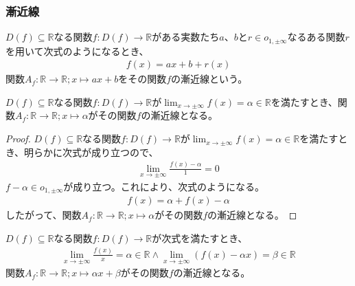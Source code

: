 \documentclass[dvipdfmx]{jsarticle}
\begin{document}
\subsubsection{漸近線}%
\begin{dfn}
$D(f) \subseteq \mathbb{R}$なる関数$f:D(f) \rightarrow \mathbb{R}$がある実数たち$a、bとr \in o_{1, \pm \infty}$なるある関数$r$を用いて次式のようになるとき、
\begin{align*}
f(x) = ax + b + r(x)
\end{align*}
関数$A_{f}:\mathbb{R} \rightarrow \mathbb{R};x \mapsto ax + b$をその関数$f$の漸近線という。
\end{dfn}
\begin{thm}\label{4.2.4.8}
$D(f) \subseteq \mathbb{R}$なる関数$f:D(f) \rightarrow \mathbb{R}$が$\lim_{x \rightarrow \pm \infty}{f(x)} = \alpha \in \mathbb{R}$を満たすとき、関数$A_{f}:\mathbb{R} \rightarrow \mathbb{R};x \mapsto \alpha$がその関数$f$の漸近線となる。
\end{thm}
\begin{proof}
$D(f) \subseteq \mathbb{R}$なる関数$f:D(f) \rightarrow \mathbb{R}$が$\lim_{x \rightarrow \pm \infty}{f(x)} = \alpha \in \mathbb{R}$を満たすとき、明らかに次式が成り立つので、
\begin{align*}
\lim_{x \rightarrow \pm \infty}\frac{f(x) - \alpha}{1} = 0
\end{align*}
$f - \alpha \in o_{1, \pm \infty}$が成り立つ。これにより、次式のようになる。
\begin{align*}
f(x) = \alpha + f(x) - \alpha
\end{align*}
したがって、関数$A_{f}:\mathbb{R} \rightarrow \mathbb{R};x \mapsto \alpha$がその関数$f$の漸近線となる。
\end{proof}
\begin{thm}\label{4.2.4.9}
$D(f) \subseteq \mathbb{R}$なる関数$f:D(f) \rightarrow \mathbb{R}$が次式を満たすとき、
\begin{align*}
\lim_{x \rightarrow \pm \infty}\frac{f(x)}{x} = \alpha \in \mathbb{R} \land \lim_{x \rightarrow \pm \infty}\left( f(x) - \alpha x \right) = \beta \in \mathbb{R}
\end{align*}
関数$A_{f}:\mathbb{R} \rightarrow \mathbb{R};x \mapsto \alpha x + \beta$がその関数$f$の漸近線となる。
\end{thm}
\end{document}
